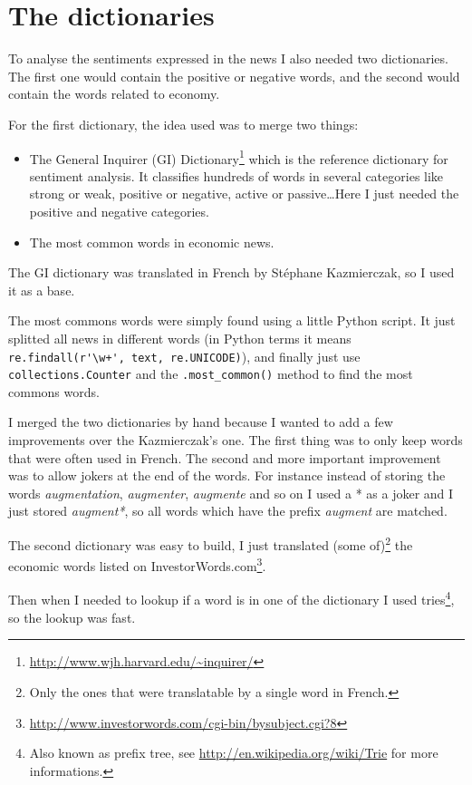 \documentclass[12pt]{report}
\begin{document}
\section{The dictionaries}

To analyse the sentiments expressed in the news I also needed two dictionaries. The first one would contain the positive or negative words, and the second would contain the words related to economy.

For the first dictionary, the idea used was to merge two things:
\begin{itemize}
	\item The General Inquirer (GI) Dictionary\footnote{\url{http://www.wjh.harvard.edu/~inquirer/}} which is the reference dictionary for sentiment analysis. It classifies hundreds of words in several categories like strong or weak, positive or negative, active or passive\ldots Here I just needed the positive and negative categories.
	\item The most common words in economic news.
\end{itemize}

The GI dictionary was translated in French by Stéphane Kazmierczak, so I used it as a base.

The most commons words were simply found using a little Python script. It just splitted all news in different words (in Python terms it means \lstinline!re.findall(r'\w+', text, re.UNICODE)!), and finally just use \lstinline!collections.Counter! and the \lstinline!.most_common()! method to find the most commons words.

I merged the two dictionaries by hand because I wanted to add a few improvements over the Kazmierczak's one. The first thing was to only keep words that were often used in French. The second and more important improvement was to allow jokers at the end of the words. For instance instead of storing the words \emph{augmentation}, \emph{augmenter}, \emph{augmente} and so on I used a * as a joker and I just stored \emph{augment*}, so all words which have the prefix \emph{augment} are matched.

The second dictionary was easy to build, I just translated (some of)\footnote{Only the ones that were translatable by a single word in French.} the economic words listed on InvestorWords.com\footnote{\url{http://www.investorwords.com/cgi-bin/bysubject.cgi?8}}.

Then when I needed to lookup if a word is in one of the dictionary I used tries\footnote{Also known as prefix tree, see \url{http://en.wikipedia.org/wiki/Trie} for more informations.}, so the lookup was fast.
\end{document}
